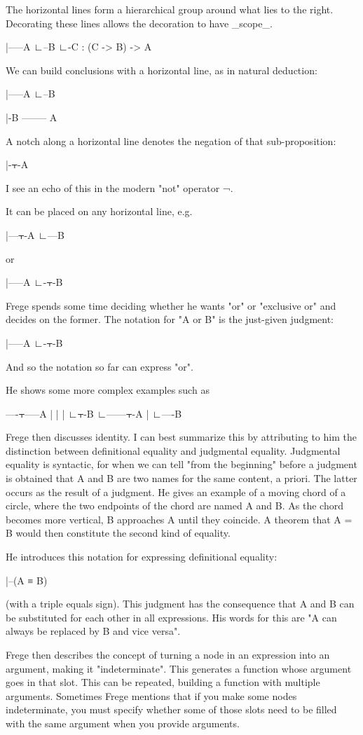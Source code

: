 The horizontal lines form a hierarchical group around what lies to the right. Decorating these lines allows the decoration to have _scope_.

|-----A
   ∟--B
    ∟-C : (C -> B) -> A

We can build conclusions with a horizontal line, as in natural deduction:

|-----A
  ∟--B

  |-B
--------
   A

A notch along a horizontal line denotes the negation of that sub-proposition:

|-⫟-A

I see an echo of this in the modern "not" operator ¬.

It can be placed on any horizontal line, e.g.


|---⫟-A
  ∟---B

or

|-----A
 ∟-⫟-B

Frege spends some time deciding whether he wants "or" or "exclusive or" and decides on the former. The notation for "A or B" is the just-given judgment:

|-----A
 ∟-⫟-B

And so the notation so far can express "or".

He shows some more complex examples such as

----⫟-----A
 |     |
 |     ∟⫟-B
 ∟------⫟-A
     |
     ∟----B

Frege then discusses identity. I can best summarize this by attributing to him the distinction between definitional equality and judgmental equality. Judgmental equality is syntactic, for when we can tell "from the beginning" before a judgment is obtained that A and B are two names for the same content, a priori. The latter occurs as the result of a judgment. He gives an example of a moving chord of a circle, where the two endpoints of the chord are named A and B. As the chord becomes more vertical, B approaches A until they coincide. A theorem that A = B would then constitute the second kind of equality. 

He introduces this notation for expressing definitional equality:

|--(A ≡ B)

(with a triple equals sign). This judgment has the consequence that A and B can be substituted for each other in all expressions. His words for this are "A can always be replaced by B and vice versa".

Frege then describes the concept of turning a node in an expression into an argument, making it "indeterminate". This generates a function whose argument goes in that slot. This can be repeated, building a function with multiple arguments. Sometimes Frege mentions that if you make some nodes indeterminate, you must specify whether some of those slots need to be filled with the same argument when you provide arguments.

